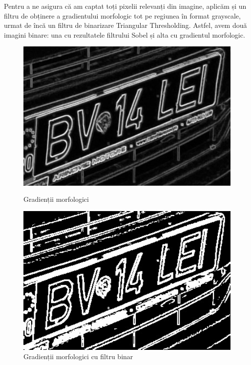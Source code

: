 \documentclass[a4paper,12pt]{report}
\begin{document}
Pentru a ne asigura că am captat toți pixelii relevanți din imagine, aplicăm și un filtru de obținere a gradientului morfologic tot pe regiunea în format grayscale, urmat de încă un filtru de binarizare Triangular Thresholding. Astfel, avem două imagini binare: una cu rezultatele filtrului Sobel și alta cu gradientul morfologic.

\begin{figure}[h]
    \centering
    \begin{minipage}{0.4\textwidth}
        \centering
        \includegraphics[width=1\textwidth]{images/gradient.jpg}
        \caption{Gradienții morfologici}
    \end{minipage}
    \hspace{0.05\textwidth}
    \begin{minipage}{0.4\textwidth}
        \centering
        \includegraphics[width=1\textwidth]{images/binary_gradient.jpg}
        \caption{Gradienții morfologici cu filtru binar}
    \end{minipage}
\end{figure}
\FloatBarrier
\end{document}
